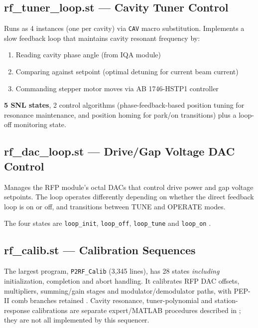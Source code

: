 \subsection{rf\_tuner\_loop.st --- Cavity Tuner Control}

Runs as 4 instances (one per cavity) via \texttt{CAV} macro substitution. Implements a slow feedback loop that maintains cavity resonant frequency by:

\begin{enumerate}
\def\labelenumi{\arabic{enumi}.}
\tightlist
\item
  Reading cavity phase angle (from IQA module)
\item
  Comparing against setpoint (optimal detuning for current beam current)
\item
  Commanding stepper motor moves via AB 1746-HSTP1 controller
\end{enumerate}

\textbf{5 SNL states}, 2 control algorithms (phase-feedback-based position tuning for resonance maintenance, and position homing for park/on transitions) plus a loop-off monitoring state.

\subsection{rf\_dac\_loop.st --- Drive/Gap Voltage DAC Control}

Manages the RFP module's octal DACs that control drive power and gap voltage setpoints. The loop operates differently depending on whether the direct feedback loop is on or off, and transitions between TUNE and OPERATE modes.

The four states are \texttt{loop\_init}, \texttt{loop\_off}, \texttt{loop\_tune} and \texttt{loop\_on} .

\subsection{rf\_calib.st --- Calibration Sequences}

The largest program, \texttt{P2RF\_Calib} (3,345 lines), has 28 states \emph{including} initialization, completion and abort handling. It calibrates RFP DAC offsets, multipliers, summing/gain stages and modulator/demodulator paths, with PEP-II comb branches retained . Cavity resonance, tuner-polynomial and station-response calibrations are separate expert/MATLAB procedures described in ; they are not all implemented by this sequencer.

